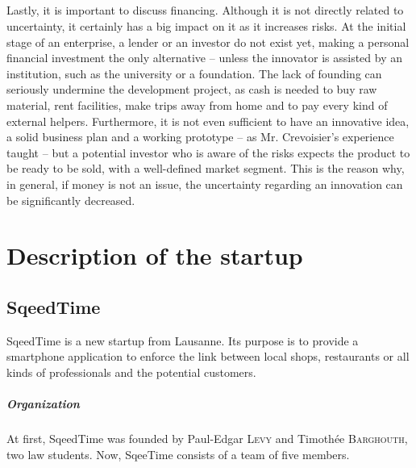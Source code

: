 \documentclass[twoside]{report}
\begin{document}
\paragraph{}
Lastly, it is important to discuss financing. Although it is not directly related to uncertainty, it certainly has a big impact on it as it increases risks. At the initial stage of an enterprise, a lender or an investor do not exist yet, making a personal financial investment the only alternative – unless the innovator is assisted by an institution, such as the university or a foundation. The lack of founding can seriously undermine the development project, as cash is needed to buy raw material, rent facilities, make trips away from home and to pay every kind of external helpers. Furthermore, it is not even sufficient to have an innovative idea, a solid business plan and a working prototype – as Mr. Crevoisier's experience taught – but a potential investor who is aware of the risks expects the product to be ready to be sold, with a well-defined market segment. This is the reason why, in general, if money is not an issue, the uncertainty regarding an innovation can be significantly decreased.









\chapter{Description of the startup}
\section{SqeedTime}
SqeedTime is a new startup from Lausanne. Its purpose is to provide a smartphone application to enforce the link between local shops, restaurants or all kinds of professionals and the potential customers.



\paragraph{Organization}
At first, SqeedTime was founded by Paul-Edgar \textsc{Levy} and Timothée \textsc{Barghouth}, two law students. Now, SqeeTime consists of a team of five members.
\end{document}
